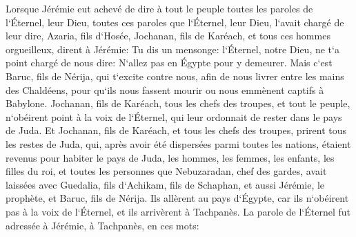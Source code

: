 \verse Lorsque Jérémie eut achevé de dire à tout le peuple toutes les paroles de l`Éternel, leur Dieu, toutes ces paroles que l`Éternel, leur Dieu, l`avait chargé de leur dire, 
\verse Azaria, fils d`Hosée, Jochanan, fils de Karéach, et tous ces hommes orgueilleux, dirent à Jérémie: Tu dis un mensonge: l`Éternel, notre Dieu, ne t`a point chargé de nous dire: N`allez pas en Égypte pour y demeurer. 
\verse Mais c`est Baruc, fils de Nérija, qui t`excite contre nous, afin de nous livrer entre les mains des Chaldéens, pour qu`ils nous fassent mourir ou nous emmènent captifs à Babylone. 
\verse Jochanan, fils de Karéach, tous les chefs des troupes, et tout le peuple, n`obéirent point à la voix de l`Éternel, qui leur ordonnait de rester dans le pays de Juda. 
\verse Et Jochanan, fils de Karéach, et tous les chefs des troupes, prirent tous les restes de Juda, qui, après avoir été dispersées parmi toutes les nations, étaient revenus pour habiter le pays de Juda, 
\verse les hommes, les femmes, les enfants, les filles du roi, et toutes les personnes que Nebuzaradan, chef des gardes, avait laissées avec Guedalia, fils d`Achikam, fils de Schaphan, et aussi Jérémie, le prophète, et Baruc, fils de Nérija. 
\verse Ils allèrent au pays d`Égypte, car ils n`obéirent pas à la voix de l`Éternel, et ils arrivèrent à Tachpanès. 
\verse La parole de l`Éternel fut adressée à Jérémie, à Tachpanès, en ces mots: 
